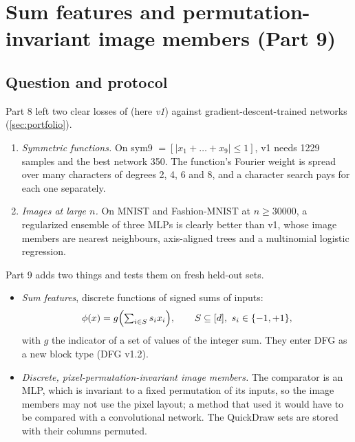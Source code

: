 \section{Sum features and permutation-invariant image members (Part 9)}\label{sec:part9}

\subsection{Question and protocol}\label{sec:p9protocol}

Part 8 left two clear losses of  (here \emph{v1}) against gradient-descent-trained networks (\cref{sec:portfolio}).
\begin{enumerate}
\item \emph{Symmetric functions.} On sym9 $=[|x_1+\dots+x_9|\le1]$, v1 needs 1229 samples and the best network 350. The function's Fourier weight is spread over many characters of degrees 2, 4, 6 and 8, and a character search pays for each one separately.
\item \emph{Images at large $n$.} On MNIST and Fashion-MNIST at $n\ge30000$, a regularized ensemble of three MLPs is clearly better than v1, whose image members are nearest neighbours, axis-aligned trees and a multinomial logistic regression.
\end{enumerate}
Part 9 adds two things and tests them on fresh held-out sets.
\begin{itemize}
\item \emph{Sum features}, discrete functions of signed sums of inputs:
\[
\phi(x)=g\Bigl(\textstyle\sum_{i\in S}s_ix_i\Bigr),\qquad S\subseteq[d],\ s_i\in\{-1,+1\},
\]
with $g$ the indicator of a set of values of the integer sum. They enter DFG as a new block type (DFG v1.2).
\item \emph{Discrete, pixel-permutation-invariant image members.} The comparator is an MLP, which is invariant to a fixed permutation of its inputs, so the image members may not use the pixel layout; a method that used it would have to be compared with a convolutional network. The QuickDraw sets are stored with their columns permuted.
\end{itemize}

